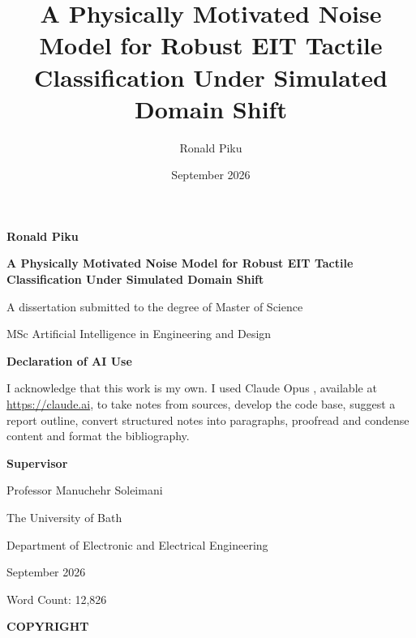 \documentclass[12pt, a4paper, oneside]{report}
\title{A Physically Motivated Noise Model for Robust EIT Tactile Classification Under Simulated Domain Shift}
\author{Ronald Piku}
\date{September 2026}
\begin{document}
\begin{titlepage}
    \centering
    
    {\Large\bfseries Ronald Piku\par}
    \vspace{1cm}
    
    {\LARGE\bfseries A Physically Motivated Noise Model for Robust EIT Tactile Classification Under Simulated Domain Shift\par}
    \vspace{2cm}
    
    {\large A dissertation submitted to the degree of Master of Science\par}
    \vspace{0.5cm}
    {\large MSc Artificial Intelligence in Engineering and Design\par}
    \vspace{1cm}

    {\large\textbf{Declaration of AI Use}\par}
    \begin{minipage}{0.85\textwidth}
    \centering\small
    I acknowledge that this work is my own. I used Claude Opus \parencite{claude2026}, available at \url{https://claude.ai}, to take notes from sources, develop the code base, suggest a report outline, convert structured notes into paragraphs, proofread and condense content and format the bibliography.
    \end{minipage}
    \vspace{1cm}
    
    {\large\textbf{Supervisor}\par}
    {\large Professor Manuchehr Soleimani\par}
    \vspace{2cm}
    
    {\large The University of Bath\par}
    {\large Department of Electronic and Electrical Engineering\par}
    \vspace{1cm}
    {\large September 2026\par}
    \vspace{2cm}
    
    {\large Word Count: 12,826\par}

\end{titlepage}

\newpage
\thispagestyle{empty}
\vspace*{5cm}
\noindent\textbf{COPYRIGHT}
\end{document}
